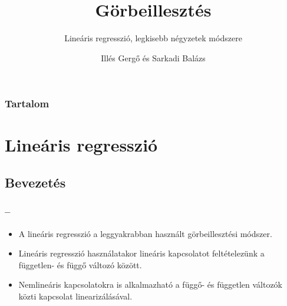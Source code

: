 \documentclass [aspectratio=169]{beamer}
\title{Görbeillesztés}
\subtitle{Lineáris regresszió, legkisebb négyzetek módszere}
\author{Illés Gergő és Sarkadi Balázs}
\institute{PTE TTK Fizikai Intézet}
\newcommand{\titten}{\secname{} -- \subsecname}
\begin{document}
\begin{frame}
\titlepage
\end{frame}
\begin{frame}
\frametitle{Tartalom}
\tableofcontents
\end{frame}
\section{Lineáris regresszió}
\subsection{Bevezetés}
\begin{frame}
\frametitle{\titten}
\begin{itemize}
\item A lineáris regresszió a leggyakrabban használt görbeillesztési módszer.
\item Lineáris regresszió használatakor lineáris kapcsolatot feltételezünk a független\hyp{} és függő változó között.
\item Nemlineáris kapcsolatokra is alkalmazható a függő\hyp{} és független változók közti kapcsolat linearizálásával.
\end{itemize}
\end{frame}
\end{document}
